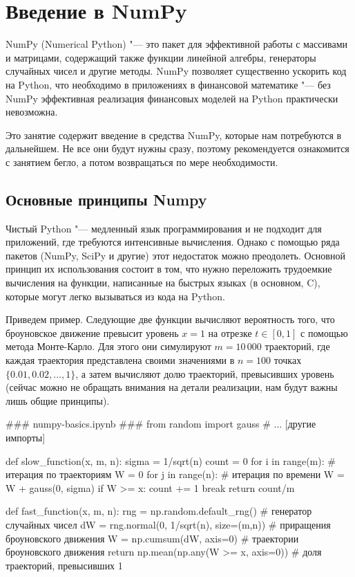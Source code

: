 \chapter{Введение в NumPy}
\label{ch:numpy}
\chaptertoc

NumPy (Numerical Python) "--- это пакет для эффективной работы с массивами и матрицами, содержащий также функции линейной алгебры, генераторы случайных чисел и другие методы. 
NumPy позволяет существенно ускорить код на Python, что необходимо в приложениях в финансовой математике "--- без NumPy эффективная реализация финансовых моделей на Python практически невозможна.

Это занятие содержит введение в средства NumPy, которые нам потребуются в дальнейшем.
Не все они будут нужны сразу, поэтому рекомендуется ознакомится с занятием бегло, а потом возвращаться по мере необходимости.

\section{Основные принципы Numpy}
Чистый Python "--- медленный язык программирования и не подходит для приложений, где требуются интенсивные вычисления. 
Однако с помощью ряда пакетов (NumPy, SciPy и другие) этот недостаток можно преодолеть.
Основной принцип их использования состоит в том, что нужно переложить трудоемкие вычисления на функции, написанные на быстрых языках (в основном, C), которые могут легко вызываться из кода на Python.

Приведем пример.
Следующие две функции вычисляют вероятность того, что броуновское движение превысит уровень $x=1$ на отрезке $t\in[0,1]$ с помощью метода Монте-Карло.
Для этого они симулируют $m=10\,000$ траекторий, где каждая траектория представлена своими значениями в $n=100$ точках $\{0.01, 0.02, \dots, 1\}$, а затем вычисляют долю траекторий, превысивших уровень (сейчас можно не обращать внимания на детали реализации, нам будут важны лишь общие принципы).

\begin{python}
### numpy-basics.ipynb ###
from random import gauss
# ... [другие импорты]

def slow_function(x, m, n):
    sigma = 1/sqrt(n)
    count = 0
    for i in range(m):  # итерация по траекториям
        W = 0
        for j in range(n):  # итерация по времени
            W = W + gauss(0, sigma)
            if W >= x:
                count += 1
                break
    return count/m

def fast_function(x, m, n):
    rng = np.random.default_rng()             # генератор случайных чисел
    dW = rng.normal(0, 1/sqrt(n), size=(m,n)) # приращения броуновского движения
    W = np.cumsum(dW, axis=0)                 # траектории броуновского движения
    return np.mean(np.any(W >= x, axis=0))    # доля траекторий, превысивших 1
\end{python}

